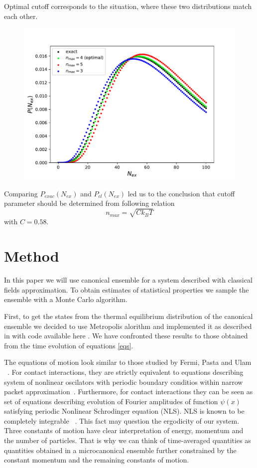 \documentclass{article}
\begin{document}
    Optimal cutoff corresponds to the situation, where these two distributions match each other.
    \begin{figure}[H]
        \centering
        \includegraphics{distcomp.pdf}
    \end{figure}
    Comparing $P_{exac}(N_{ex})$ and $P_{cl}(N_{ex})$ led us to the conclusion that cutoff parameter should be determined from following relation
    \begin{equation}
    \label{eq:cutoff}
    n_{max} = \sqrt{C k_B T}
    \end{equation}
    with $C=0.58$.
 
 
 \section{Method}
     In this paper we will use canonical ensemble for a system described with classical fields approximation. To obtain estimates of statistical properties we sample the ensemble with a Monte Carlo algorithm.
     
     First, to get the states from the thermal equilibrium distribution of the canonical ensemble we decided to use Metropolis alorithm \cite{metropolis1953equation} and implemented it as described in \cite{metropolisImplementation} with code available here \cite{repoLink}. We have confronted these results to those  obtained from the time evolution of equations \ref{eqs}.
    
    The equations of motion look similar to those studied by Fermi, Pasta and Ulam ~\cite{fermi1955studies}. For contact interactions, they are strictly equivalent to equations describing system of nonlinear oscilators with periodic boundary conditios within narrow packet approximation~\cite{berman1984limit}. Furthermore, for contact interactions they can be seen as set of equations describing evolution of Fourier amplitudes of function $\psi(x)$ satisfying periodic Nonlinear Schrodinger equation (NLS). NLS is known to be completely integrable ~\cite{berman1984limit}. This fact may question the ergodicity of our system. Three constants of motion have clear interpretation of energy, momentum and the number of particles. That is why we can think of time-averaged quantities as quantities obtained in a microcanonical ensemble further constrained by the constant momentum and the remaining constants of motion.
\end{document}
